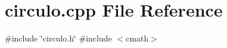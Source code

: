 \section{circulo.\+cpp File Reference}
\label{circulo_8cpp}
{\ttfamily \#include \char`\"{}circulo.\+h\char`\"{}}\newline
{\ttfamily \#include $<$cmath$>$}\newline
